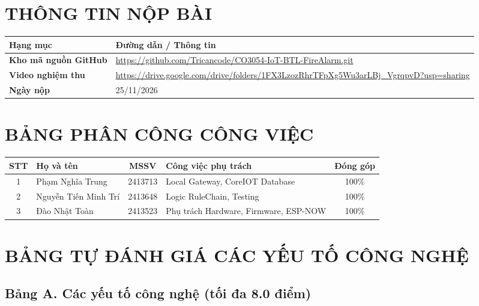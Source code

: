 \section*{THÔNG TIN NỘP BÀI}

\begin{table}[H]
\centering
\begin{tabular}{|l|p{10cm}|}
\hline
\textbf{Hạng mục} & \textbf{Đường dẫn / Thông tin} \\ \hline
\textbf{Kho mã nguồn GitHub} & \url{https://github.com/Tricancode/CO3054-IoT-BTL-FireAlarm.git} \\ \hline
\textbf{Video nghiệm thu} & \url{https://drive.google.com/drive/folders/1FX3LzozRhrTFpXg5Wu3arLBj_VgrqpvD?usp=sharing} \\ \hline
\textbf{Ngày nộp} & 25/11/2026 \\ \hline
\end{tabular}
\end{table}

\bigskip
\section*{BẢNG PHÂN CÔNG CÔNG VIỆC}

\begin{table}[H]
\centering
\begin{tabular}{|c|p{4cm}|c|p{6cm}|c|}
\hline
\textbf{STT} & \textbf{Họ và tên} & \textbf{MSSV} & \textbf{Công việc phụ trách} & \textbf{Đóng góp} \\ \hline
1 & Phạm Nghĩa Trung & 2413713 &  Local Gateway, CoreIOT Database & 100\% \\ \hline
2 & Nguyễn Tiến Minh Trí & 2413648 & Logic RuleChain, Testing  & 100\% \\ \hline
3 & Đào Nhật Toàn & 2413523 & Phụ trách Hardware, Firmware, ESP-NOW & 100\% \\ \hline
\end{tabular}
\end{table}

\bigskip
\section*{BẢNG TỰ ĐÁNH GIÁ CÁC YẾU TỐ CÔNG NGHỆ}

\subsection*{Bảng A. Các yếu tố công nghệ (tối đa 8.0 điểm)}


